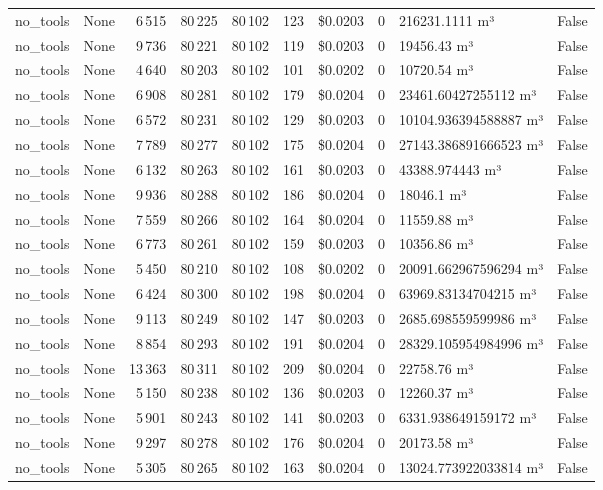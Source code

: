 \documentclass[a4paper,11pt]{article}
\begin{document}
\begin{table}[H]
{\begin{tabular}{l r r r r r r r l r}
no\_tools & None & 6\,515 & 80\,225 & 80\,102 & 123 & \$0.0203 & 0 & 216231.1111 m³ & False \\
no\_tools & None & 9\,736 & 80\,221 & 80\,102 & 119 & \$0.0203 & 0 & 19456.43 m³ & False \\
no\_tools & None & 4\,640 & 80\,203 & 80\,102 & 101 & \$0.0202 & 0 & 10720.54 m³ & False \\
no\_tools & None & 6\,908 & 80\,281 & 80\,102 & 179 & \$0.0204 & 0 & 23461.60427255112 m³ & False \\
no\_tools & None & 6\,572 & 80\,231 & 80\,102 & 129 & \$0.0203 & 0 & 10104.936394588887 m³ & False \\
no\_tools & None & 7\,789 & 80\,277 & 80\,102 & 175 & \$0.0204 & 0 & 27143.386891666523 m³ & False \\
no\_tools & None & 6\,132 & 80\,263 & 80\,102 & 161 & \$0.0203 & 0 & 43388.974443 m³ & False \\
no\_tools & None & 9\,936 & 80\,288 & 80\,102 & 186 & \$0.0204 & 0 & 18046.1 m³ & False \\
no\_tools & None & 7\,559 & 80\,266 & 80\,102 & 164 & \$0.0204 & 0 & 11559.88 m³ & False \\
no\_tools & None & 6\,773 & 80\,261 & 80\,102 & 159 & \$0.0203 & 0 & 10356.86 m³ & False \\
no\_tools & None & 5\,450 & 80\,210 & 80\,102 & 108 & \$0.0202 & 0 & 20091.662967596294 m³ & False \\
no\_tools & None & 6\,424 & 80\,300 & 80\,102 & 198 & \$0.0204 & 0 & 63969.83134704215 m³ & False \\
no\_tools & None & 9\,113 & 80\,249 & 80\,102 & 147 & \$0.0203 & 0 & 2685.698559599986 m³ & False \\
no\_tools & None & 8\,854 & 80\,293 & 80\,102 & 191 & \$0.0204 & 0 & 28329.105954984996 m³ & False \\
no\_tools & None & 13\,363 & 80\,311 & 80\,102 & 209 & \$0.0204 & 0 & 22758.76 m³ & False \\
no\_tools & None & 5\,150 & 80\,238 & 80\,102 & 136 & \$0.0203 & 0 & 12260.37 m³ & False \\
no\_tools & None & 5\,901 & 80\,243 & 80\,102 & 141 & \$0.0203 & 0 & 6331.938649159172 m³ & False \\
no\_tools & None & 9\,297 & 80\,278 & 80\,102 & 176 & \$0.0204 & 0 & 20173.58 m³ & False \\
no\_tools & None & 5\,305 & 80\,265 & 80\,102 & 163 & \$0.0204 & 0 & 13024.773922033814 m³ & False \\

\end{tabular}}
\end{table}
\end{document}
